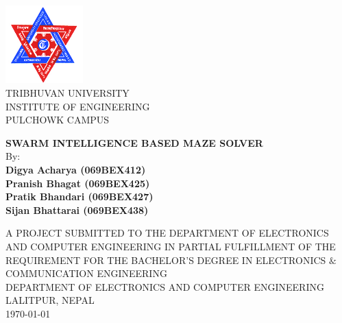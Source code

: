 \begin{center}
 \vspace*{-3.0cm}
 
\includegraphics[width = 30mm]{logo.jpg}\\ [1.5mm] 

 TRIBHUVAN UNIVERSITY\\
        INSTITUTE OF ENGINEERING\\
        PULCHOWK CAMPUS\\
 \vspace{1.0cm}
 
 \center
		\textbf{\Large SWARM INTELLIGENCE BASED MAZE SOLVER}\\[2cm]
		
		 \center
		By:\\[2mm]
		\textbf{\large Digya Acharya (069BEX412)\\
		\large Pranish Bhagat (069BEX425)\\
		\large Pratik Bhandari (069BEX427)\\
		\large Sijan Bhattarai (069BEX438)}\\
    \vspace{2cm}
    
    \center
			 A PROJECT SUBMITTED TO THE DEPARTMENT OF ELECTRONICS AND COMPUTER ENGINEERING IN PARTIAL FULFILLMENT OF THE REQUIREMENT FOR THE BACHELOR'S DEGREE IN ELECTRONICS $\&$ COMMUNICATION ENGINEERING\\[1.5cm]
\center 
DEPARTMENT OF ELECTRONICS AND COMPUTER ENGINEERING
\center LALITPUR, NEPAL\\[1cm]
\center \today
	
 \end{center}